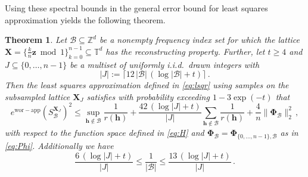 \documentclass[a4paper]{amsart}
\newtheorem{theorem}{Theorem}[section]
\newcommand{\ewc}{e^{\mathrm{wor-app}}}
\newcommand{\modone}{\bmod{}1}
\begin{document}
Using these spectral bounds in the general error bound for least squares approximation yields the following theorem.

\begin{theorem}\label{withPhi} Let $\mathcal B\subseteq\mathds Z^d$ be a nonempty frequency index set for which the lattice $\bm X = \{\frac kn\bm z\modone\}_{k=0}^{n-1} \subseteq\mathds T^d$ has the reconstructing property.
    Further, let $t\ge4$ and $J\subseteq\{0, \dots, n-1\}$ be a multiset of uniformly i.i.d.\ drawn integers with
    \begin{equation*}
|J| := \lceil 12 \, |\mathcal B| \, (\log|\mathcal B| + t)\rceil\,.
    \end{equation*}
    Then the least squares approximation defined in \eqref{eq:lsqr} using samples on the subsampled lattice $\bm X_J$ satisfies with probability exceeding $1-3\exp(-t)$ that
    \begin{equation*}
        \ewc(S_{\mathcal B}^{\bm X_J})^2
        \le \sup_{\bm h\notin\mathcal B} \frac{1}{r(\bm h)}
        + 
        \frac{42\,(\log|J|+t)}{|J|}
\sum_{\bm h\notin\mathcal B} \frac{1}{r(\bm h)} + \frac{4}{n} \|
        \bm\Phi_{\mathcal B}\|_{2}^2 \,,
    \end{equation*}
    with respect to the function space defined in \eqref{eq:H} and $\bm\Phi_{\mathcal B} = \bm\Phi_{\{0,\dots,n-1\},\mathcal B}$ as in \eqref{eq:Phi}. Additionally we have
    \begin{equation}\label{eq:JB}
         \frac{6\,(\log|J|+t)}{|J|} 
         \le \frac{1}{|\mathcal B|} 
         \le \frac{13\,(\log|J|+t)}{|J|} \,.
    \end{equation}
\end{theorem} 
\end{document}
